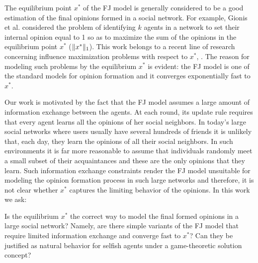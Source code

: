 The equilibrium point $x^*$ of the FJ model is generally considered to be a
good estimation of the final opinions formed in a social network. For example,
Gionis et al.  \cite{GTT13} considered the problem of identifying $k$ agents in
a network to set their internal opinion equal to 1 so as to maximize the sum
of the opinions in the equilibrium point $x^*$ ($\norm{1}{x^*}$). This work
belongs to a recent line of research concerning influence maximization problems
with respect to $x^*$, \cite{GTT13,AKPT18,MMT17}. The reason for modeling such
problems by the equilibrium $x^*$ is evident: the FJ model is one of the
standard models for opinion formation and it converges exponentially fast to
$x^*$.

Our work is motivated by the fact that the FJ model assumes a large amount of
information exchange between the agents. At each round, its update rule
requires that every agent learns all the opinions of her social neighbors. In
today's large social networks where users usually have several hundreds of
friends it is unlikely that, each day, they learn the opinions of all their
social neighbors.  In such environments it is far more reasonable to assume
that individuals randomly meet a small subset of their acquaintances and these
are the only opinions that they learn. Such information exchange constraints
render the FJ model unsuitable for modeling the opinion formation process in
such large networks and therefore, it is not clear whether $x^*$ captures the
limiting behavior of the opinions. In this work we ask:
%
\begin{question}\label{q:motivation1}
  Is the equilibrium $x^*$ the correct way to model the final formed opinions
  in a large social network? Namely, are there simple variants of the FJ model
  that require limited information exchange and converge fast to $x^*$? Can
  they be justified as natural behavior for selfish agents under a
  game-theoretic solution concept?
\end{question}

